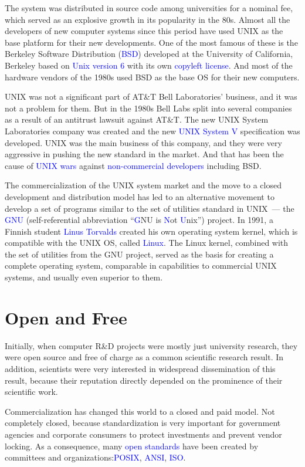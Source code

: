\documentclass[12pt]{report}
\newcommand{\struct}[1]{\textcolor{blue}{#1}}
\begin{document}
\medskip
The system was distributed in source code among universities for a nominal fee,
which served as an explosive growth in its popularity in the 80s.
Almost all the developers of new computer systems since this period have used
UNIX as the base platform for their new developments. One of the most famous of
these is the Berkeley Software Distribution (\struct{BSD}) developed at
the University of California, Berkeley based on \struct{Unix version 6}
with its own \struct{copyleft license}. And most of the hardware vendors of
the 1980s used BSD as the base OS for their new computers.

\medskip
UNIX was not a significant part of AT\&T Bell Laboratories' business,
and it was not a problem for them. But in the 1980s Bell Labs split
into several companies as a result of an antitrust lawsuit against AT\&T.
The new UNIX System Laboratories company was created and the new
\struct{UNIX System V} specification was developed. UNIX was the main business
of this company, and they were very aggressive in pushing the new standard in
the market. And that has been the cause of \struct{UNIX wars} against
\struct{non-commercial developers} including BSD.

\medskip
The commercialization of the UNIX system market and the move to a closed
development and distribution model has led to an alternative movement to
develop a set of programs similar to the set of utilities standard in UNIX~---
the \struct{GNU} (self-referential abbreviation
``\struct{G}NU is \struct{N}ot \struct{U}nix'') project.
In 1991, a Finnish student \struct{Linus Torvalds} created his own operating
system kernel, which is compatible with the UNIX OS, called \struct{Linux}.
The Linux kernel, combined with the set of utilities from the GNU project,
served as the basis for creating a complete operating system, comparable
in capabilities to commercial UNIX systems, and usually even superior to them.

\section*{Open and Free}

Initially, when computer R\&D projects were mostly just university research,
they were open source and free of charge as a common scientific research result.
In addition, scientists were very interested in widespread dissemination of
this result, because their reputation directly depended on the prominence of
their scientific work.

\medskip
Commercialization has changed this world to a closed and paid model.
Not completely closed, because standardization is very important for
government agencies and corporate consumers to protect investments and
prevent vendor locking. As a consequence, many \struct{open standards} have been
created by committees and organizations:\struct{POSIX}, \struct{ANSI}, \struct{ISO}.
\end{document}
